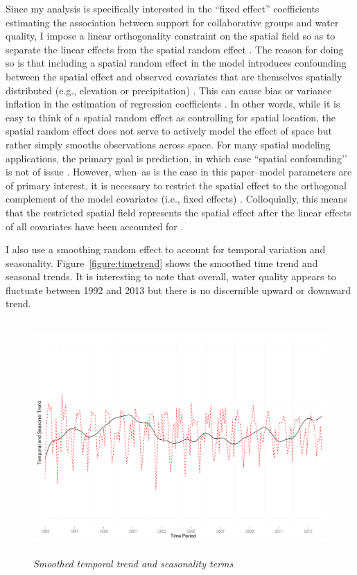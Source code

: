 \documentclass[12pt,a4paper,titlepage]{article}
\begin{document}
Since my analysis is specifically interested in the ``fixed effect'' coefficients estimating the association between support for collaborative groups and water quality, I impose a linear orthogonality constraint on the spatial field so as to separate the linear effects from the spatial random effect \parencite{ingebrigtsen2015}. The reason for doing so is that including a spatial random effect in the model introduces confounding between the spatial effect and observed covariates that are themselves spatially distributed (e.g., elevation or precipitation) \parencite{hodges2014}. This can cause bias or variance inflation in the estimation of regression coefficients \parencite{hughes2014}. In other words, while it is easy to think of a spatial random effect as controlling for spatial location, the spatial random effect does not serve to actively model the effect of space but rather simply smooths observations across space. For many spatial modeling applications, the primary goal is prediction, in which case ``spatial confounding’’ \parencite{reich2006} is not of issue \parencite{hughes2014}. However, when--as is the case in this paper--model parameters are of primary interest, it is necessary to restrict the spatial effect to the orthogonal complement of the model covariates (i.e., fixed effects) \parencite{hodges2010,hodges2014}. Colloquially, this means that the restricted spatial field represents the spatial effect after the linear effects of all covariates have been accounted for \parencite{ingebrigtsen2015}.

I also use a smoothing random effect to account for temporal variation and seasonality. Figure~\ref{figure:timetrend} shows the smoothed time trend and seasonal trends. It is interesting to note that overall, water quality appears to fluctuate between 1992 and 2013 but there is no discernible upward or downward trend.

\begin{figure}[!ht]
\graphicspath{ {`/Users/TScott/Google\space Drive/quinalt/APPAM_2014/'}}
\noindent
\includegraphics[trim = 4mm 3mm 5mm 18mm, clip, width=6in, height=3.5in]{timetrendplot.png}
\caption{\textit{Smoothed temporal trend and seasonality terms}}
\label{fig:timetrend}
\end{figure}
\end{document}
